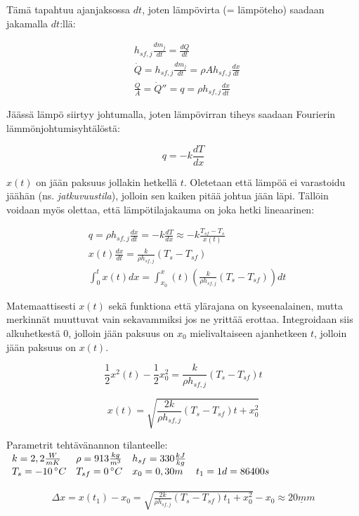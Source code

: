 \documentclass[12pt,a4paper,finnish]{article}
\begin{document}
Tämä tapahtuu ajanjaksossa $dt$, joten lämpövirta (= lämpöteho) saadaan jakamalla $dt$:llä:

\begin{align}
 &h_{sf, j}\frac{dm_j}{dt} = \frac{dQ}{dt}\\
 &\dot{Q} = h_{sf, j}\frac{dm_j}{dt} = \rho Ah_{sf, j}\frac{dx}{dt}\\
 &\frac{\dot{Q}}{A} = \dot{Q}'' = q = \rho h_{sf, j}\frac{dx}{dt}
\end{align}

Jäässä lämpö siirtyy johtumalla, joten lämpövirran tiheys saadaan Fourierin lämmönjohtumisyhtälöstä:

\begin{equation}
 q = -k\frac{dT}{dx}
\end{equation}

$x(t)$ on jään paksuus jollakin hetkellä $t$. Oletetaan että lämpöä ei varastoidu jäähän (ns. 
\textit{jatkuvuustila}), jolloin sen kaiken pitää johtua jään läpi. Tällöin voidaan myös 
olettaa, että lämpötilajakauma on joka hetki lineaarinen:

\begin{align}
 &q = \rho h_{sf, j}\frac{dx}{dt} = -k\frac{dT}{dx} \approx -k\frac{T_{sf} - T_s}{x(t)}\\
 &x(t)\frac{dx}{dt} = \frac{k}{\rho h_{sf, j}}(T_s - T_{sf})\\
 &\int_0^t x(t)dx = \int_{x_0}^x(t) \left(\frac{k}{\rho h_{sf, j}}(T_s - T_{sf}) \right) dt
\end{align}

Matemaattisesti $x(t)$ sekä funktiona että ylärajana on kyseenalainen, mutta merkinnät 
muuttuvat vain sekavammiksi jos ne yrittää erottaa. Integroidaan siis alkuhetkestä $0$, jolloin 
jään paksuus on $x_0$ mielivaltaiseen ajanhetkeen $t$, jolloin jään paksuus on $x(t)$.

\begin{equation}
 \frac{1}{2}x^2(t) - \frac{1}{2}x_0^2 = \frac{k}{\rho h_{sf, j}}(T_s - T_{sf}) t
\end{equation}

\begin{framed}
 \begin{equation}
  x(t) = \sqrt{\frac{2k}{\rho h_{sf, j}}(T_s - T_{sf}) t + x_0^2}
 \end{equation}
\end{framed}

Parametrit tehtävänannon tilanteelle:\\

\begin{math}
 \begin{array}{l l l l}
  k = 2,2\frac{W}{mK} & \rho = 913\frac{kg}{m^3} & h_{sf} = 330 \frac{kJ}{kg} &\\
  T_s = -10\,^{\circ}C & T_{sf} = 0\,^{\circ}C & x_0 = 0,30 m & t_1 = 1d = 86400 s
 \end{array}
\end{math}

\begin{align}
 \Delta x = x(t_1) - x_0 = \sqrt{\frac{2k}{\rho h_{sf, j}}(T_s - T_{sf}) t_1 + x_0^2} - x_0 
   \approx \underline{20 mm}
\end{align}
\end{document}

